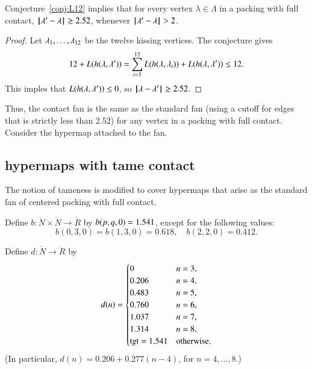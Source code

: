 \begin{lemma}  Conjecture~\ref{conj:L12} implies that for every vertex $\lambda\in\Lambda$ in a packing with full contact, ${\hskip0.1em|\hskip-0.15em|\hskip0.1em}\lambda' - \lambda{\hskip0.1em|\hskip-0.15em|\hskip0.1em}\ge 2.52$, whenever ${\hskip0.1em|\hskip-0.15em|\hskip0.1em}\lambda' - \lambda{\hskip0.1em|\hskip-0.15em|\hskip0.1em}> 2$.
\end{lemma}

\begin{proof} Let $\lambda_1,\ldots,\lambda_{12}$ be the twelve kissing vertices.  The conjecture gives
$$
12 + L(h(\lambda,\lambda')) = \sum_{i=1}^{12} L(h(\lambda,\lambda_i)) + L(h(\lambda,\lambda')) \le 12.
$$
This imples that $L(h(\lambda,\lambda'))\le 0$, so ${\hskip0.1em|\hskip-0.15em|\hskip0.1em}\lambda - \lambda'{\hskip0.1em|\hskip-0.15em|\hskip0.1em}\ge 2.52$.
\end{proof}

Thus, the contact fan is the same as the standard fan (using a cutoff for edges that is strictly less than $2.52$) for any vertex in a packing with full contact.  Consider the hypermap attached to the fan.


\subsection{hypermaps with tame contact}

The notion of tameness is modified to cover hypermaps that arise as the standard fan of centered packing with full contact.  

\begin{definition}[b]
Define $b:\ring{N}\times \ring{N}\to \ring{R}$ by $b(p,q,0)=1.541$,   except for the following values:
$$
b(0,3,0)=b(1,3,0)=0.618,\quad b(2,2,0)=0.412.
$$
\end{definition}

\begin{definition}[d]
    Define $d:\ring{N}\to \ring{R}$ by
  $$d(n) = \begin{cases}
    0 & n=3, \\
    0.206 & n=4, \\
    0.483 & n=5, \\
    0.760 & n=6, \\
    1.037 & n=7, \\
    1.314 & n=8,\\
    {\operatorname{tgt}}=1.541 & \text{otherwise}.
  \end{cases}
  $$
(In particular, $d(n) = 0.206 + 0.277 (n-4)$, for $n=4,\ldots,8$.)
\end{definition}

